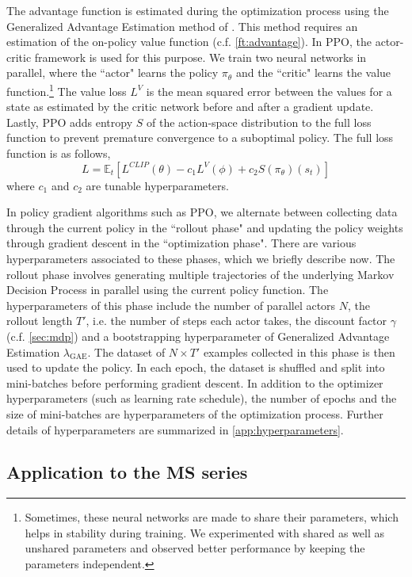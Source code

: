 The advantage function is estimated during the optimization process using the Generalized Advantage Estimation method of \cite{schulman2018highdimensional}.
This method requires an estimation of the on-policy value function (c.f. \cref{ft:advantage}).
In PPO, the actor-critic framework is used for this purpose. We train two neural networks in parallel, where the ``actor" learns the policy $\pi_\theta$ and the ``critic" learns the value function.\footnote{
Sometimes, these neural networks are made to share their parameters, which helps in stability during training.
We experimented with shared as well as unshared parameters and observed better performance by keeping the parameters independent.}
The value loss $L^V$ is the mean squared error between the values for a state as estimated by the critic network before and after a gradient update.
Lastly, PPO adds entropy $S$ of the action-space distribution to the full loss function to prevent premature convergence to a suboptimal policy. The full loss function is as follows,
\[
L = \mathbb{E}_{t} \left[ L^{CLIP}(\theta) - c_1 L^{V}(\phi) + c_2 S(\pi_\theta)(s_t) \right]
\]
where $c_1$ and $c_2$ are tunable hyperparameters.

In policy gradient algorithms such as PPO, we alternate between collecting data through the current policy in the ``rollout phase" and updating the policy weights through gradient descent in the ``optimization phase". There are various hyperparameters associated to these phases, which we briefly describe now. The rollout phase involves generating multiple trajectories of the underlying Markov Decision Process in parallel using the current policy function.
The hyperparameters of this phase include the number of parallel actors $N$, the rollout length $T'$, i.e. the number of steps each actor takes, the discount factor $\gamma$ (c.f. \cref{sec:mdp}) and a bootstrapping hyperparameter of Generalized Advantage Estimation $\lambda_{\text{GAE}}$. The dataset of $N \times T'$ examples collected in this phase is then used to update the policy. In each epoch, the dataset is shuffled and split into mini-batches before performing gradient descent.
In addition to the optimizer hyperparameters (such as learning rate schedule), the number of epochs and the size of mini-batches are hyperparameters of the optimization process.
Further details of hyperparameters are summarized in \cref{app:hyperparameters}.

\subsection{Application to the MS series}\label{sec:application}

